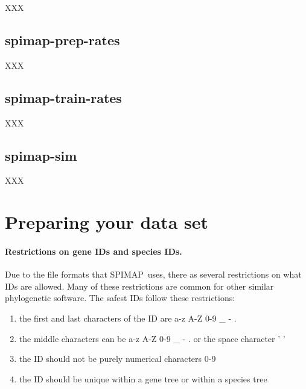 \documentclass[11pt]{article}
\newcommand{\spimap}{{\sf\scshape SPIMAP}}
\begin{document}
XXX

\subsection{spimap-prep-rates}
\label{sec:prog:spimap-prep-rates}

XXX

\subsection{spimap-train-rates}
\label{sec:prog:spimap-train-rates}

XXX

\subsection{spimap-sim}
\label{sec:prog:spimap-sim}

XXX



\section{Preparing your data set}
\label{sec:prepar}

\paragraph{Restrictions on gene IDs and species IDs.}  Due to the
file formats that \spimap\ uses, there as several restrictions on what IDs
are allowed.  Many of these restrictions are common for other similar
phylogenetic software.  The safest IDs follow these restrictions:
\begin{enumerate}[itemsep=0pt,topsep=0pt]
\item the first and last characters of the ID are a-z A-Z 0-9 \_ - .
\item the middle characters can be a-z A-Z 0-9 \_ - . or the space character ' '
\item the ID should not be purely numerical characters 0-9
\item the ID should be unique within a gene tree or within a species tree
\end{enumerate}
\end{document}
